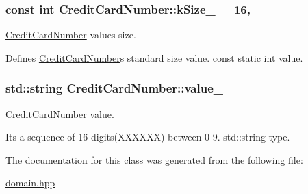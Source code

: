 \subsubsection[{\texorpdfstring{k\+Size\+\_\+}{kSize_}}]{\setlength{\rightskip}{0pt plus 5cm}const int Credit\+Card\+Number\+::k\+Size\+\_\+ = 16\hspace{0.3cm}{\ttfamily [static]}, {\ttfamily [private]}}\hypertarget{classCreditCardNumber_a6d0f1ed7f6c1705c65b582f39fccd783}{}\label{classCreditCardNumber_a6d0f1ed7f6c1705c65b582f39fccd783}


\hyperlink{classCreditCardNumber}{Credit\+Card\+Number} value\textquotesingle{}s size. 

Defines \hyperlink{classCreditCardNumber}{Credit\+Card\+Number}\textquotesingle{}s standard size value. const static int value. 
\subsubsection[{\texorpdfstring{value\+\_\+}{value_}}]{\setlength{\rightskip}{0pt plus 5cm}std\+::string Credit\+Card\+Number\+::value\+\_\+\hspace{0.3cm}{\ttfamily [private]}}\hypertarget{classCreditCardNumber_aa7cc38774983178f7d851067e085b31c}{}\label{classCreditCardNumber_aa7cc38774983178f7d851067e085b31c}


\hyperlink{classCreditCardNumber}{Credit\+Card\+Number} value. 

It\textquotesingle{}s a sequence of 16 digits(\+X\+X\+X\+X\+X\+X) between 0-\/9. std\+::string type. 

The documentation for this class was generated from the following file\+:\begin{DoxyCompactItemize}
\item 
\hyperlink{domain_8hpp}{domain.\+hpp}\end{DoxyCompactItemize}
